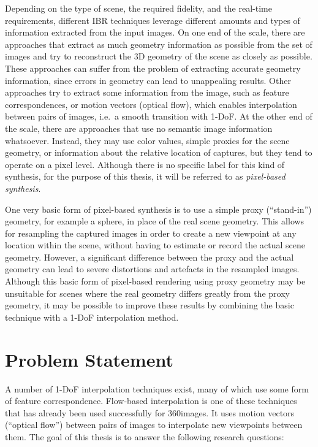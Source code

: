 Depending on the type of scene, the required fidelity, and the real-time requirements, different IBR techniques leverage different amounts and types of information extracted from the input images.
On one end of the scale, there are approaches that extract as much geometry information as possible from the set of images and try to reconstruct the 3D geometry of the scene as closely as possible. These approaches can suffer from the problem of extracting accurate geometry information, since errors in geometry can lead to unappealing results.
Other approaches try to extract some information from the image, such as feature correspondences, or motion vectors (optical flow), which enables interpolation between pairs of images, i.e.\ a smooth transition with 1-DoF.
At the other end of the scale, there are approaches that use no semantic image information whatsoever. Instead, they may use color values, simple proxies for the scene geometry, or information about the relative location of captures, but they tend to operate on a pixel level. Although there is no specific label for this kind of synthesis, for the purpose of this thesis, it will be referred to as \emph{pixel-based synthesis}.

One very basic form of pixel-based synthesis is to use a simple proxy (``stand-in'') geometry, for example a sphere, in place of the real scene geometry\footnotemark. This allows for resampling the captured images in order to create a new viewpoint at any location within the scene, without having to estimate or record the actual scene geometry. However, a significant difference between the proxy and the actual geometry can lead to severe distortions and artefacts in the resampled images. Although this basic form of pixel-based rendering using proxy geometry may be unsuitable for scenes where the real geometry differs greatly from the proxy geometry, it may be possible to improve these results by combining the basic technique with a 1-DoF interpolation method.

\section*{Problem Statement}
A number of 1-DoF interpolation techniques exist, many of which use some form of feature correspondence. Flow-based interpolation is one of these techniques that has already been used successfully for 360\degree images. It uses motion vectors (``optical flow'') between pairs of images to interpolate new viewpoints between them. The goal of this thesis is to answer the following research questions:

